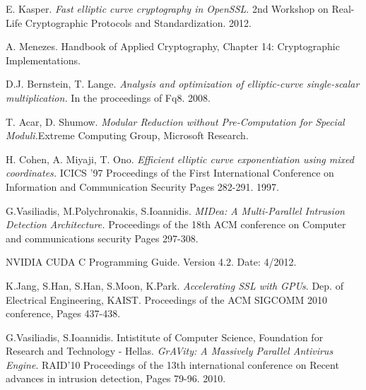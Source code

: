 \documentclass[11pt,twocolumn]{IEEEtran}
\begin{document}
\begin{thebibliography}{9}
E. Kasper. \emph{Fast elliptic curve cryptography in OpenSSL}. 2nd Workshop on Real-Life Cryptographic Protocols and Standardization. 2012.

A. Menezes.
Handbook of Applied Cryptography, Chapter 14: Cryptographic Implementations.


D.J. Bernstein, T. Lange.
\emph{Analysis and optimization of elliptic-curve single-scalar multiplication.}
 In the proceedings of Fq8. 2008.

T. Acar, D. Shumow.
\emph{Modular Reduction without Pre-Computation for Special Moduli.}Extreme Computing Group, Microsoft Research.

H. Cohen, A. Miyaji, T. Ono.
\emph{Efficient elliptic curve exponentiation using mixed coordinates.} ICICS '97 Proceedings of the First International Conference on Information and Communication Security
Pages 282-291. 1997.

G.Vasiliadis, M.Polychronakis, S.Ioannidis.
\emph{MIDea: A Multi-Parallel Intrusion Detection Architecture.}  Proceedings of the 18th ACM conference on Computer and communications security Pages 297-308. 

NVIDIA CUDA C Programming Guide. Version 4.2. Date: 4/2012.

K.Jang, S.Han, S.Han, S.Moon, K.Park.
\emph{Accelerating SSL with GPUs}.
Dep. of Electrical Engineering, KAIST. Proceedings of the ACM SIGCOMM 2010 conference, Pages 437-438.

G.Vasiliadis, S.Ioannidis.
Intistitute of Computer Science, Foundation for Research and Technology - Hellas.
\emph{GrAVity: A Massively Parallel Antivirus Engine}. RAID'10 Proceedings of the 13th international conference on Recent advances in intrusion detection, Pages 79-96. 2010.


\end{thebibliography}
\end{document}
